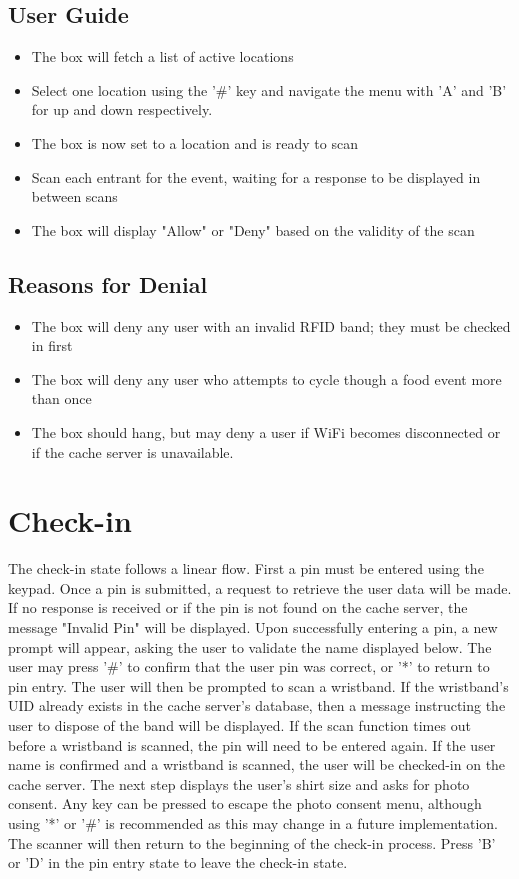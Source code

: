 \documentclass{article}
\begin{document}
\subsection{User Guide}
\begin{itemize}
	\item The box will fetch a list of active locations
	\item Select one location using the '\#' key and navigate the menu with 'A' and 'B' for up and down respectively.
	\item The box is now set to a location and is ready to scan
	\item Scan each entrant for the event, waiting for a response to be displayed in between scans
	\item The box will display "Allow" or "Deny" based on the validity of the scan
\end{itemize}
\subsection{Reasons for Denial}
\begin{itemize}
	\item The box will deny any user with an invalid RFID band; they must be checked in first
	\item The box will deny any user who attempts to cycle though a food event more than once
	\item The box should hang, but may deny a user if WiFi becomes disconnected or if the cache server is unavailable.
\end{itemize}

\section{Check-in}
The check-in state follows a linear flow.  First a pin must be entered using the keypad.  Once a pin is submitted, a request to retrieve the user data will be made.  If no response is received or if the pin is not found on the cache server, the message "Invalid Pin" will be displayed.  Upon successfully entering a pin, a new prompt will appear, asking the user to validate the name displayed below.  The user may press '\#' to confirm that the user pin was correct, or '*' to return to pin entry.  The user will then be prompted to scan a wristband.  If the wristband's UID already exists in the cache server's database, then a message instructing the user to dispose of the band will be displayed.  If the scan function times out before a wristband is scanned, the pin will need to be entered again. If the user name is confirmed and a wristband is scanned, the user will be checked-in on the cache server.  The next step displays the user's shirt size and asks for photo consent.  Any key can be pressed to escape the photo consent menu, although using '*' or '\#' is recommended as this may change in a future implementation.  The scanner will then return to the beginning of the check-in process.  Press 'B' or 'D' in the pin entry state to leave the check-in state. 
\end{document}

